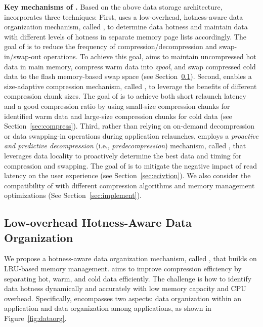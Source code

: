 \noindent\textbf{Key mechanisms of \proposal.} 
Based on the above data storage architecture, \proposal incorporates three techniques: 
First, \proposal uses a low-overhead, hotness-aware data organization mechanism, called \dataorg, to determine data hotness and maintain data with different levels of hotness in separate memory page lists accordingly. 
The goal of \dataorg is to reduce the frequency of compression/decompression and swap-in/swap-out operations. To achieve this goal, \proposal aims to maintain uncompressed hot data in main memory,  compress warm data into \emph{zpool}, and swap compressed cold data to the flash memory-based swap space (see Section~\ref{sec:dataorg}).
Second, \proposal enables a size-adaptive compression mechanism, called \compress, to leverage the benefits of different compression chunk sizes. The goal of  \compress is to achieve both short relaunch latency and a good compression ratio by using small-size compression chunks for identified warm data and large-size compression chunks for cold data (see Section~\ref{sec:compress}). 
Third, rather than relying on on-demand decompression or data swapping-in operations during application relaunches, \proposal employs a \emph{proactive and predictive decompression} (i.e., \emph{predecompression}) mechanism, called \predi, that leverages data locality to proactively determine the best data and timing for compression and swapping. The goal of \predi is to mitigate the negative impact of read latency on the user experience (see Section~\ref{sec:ecivtion}). 
We also consider the compatibility of \proposal with different compression algorithms and memory management optimizations (See Section~\ref{sec:implement}). 



 

\subsection{Low-overhead Hotness-Aware Data Organization}
\label{sec:dataorg}


We propose a hotness-aware data organization mechanism, called \dataorg, that builds on LRU-based memory management. 
\dataorg aims to improve compression efficiency by separating hot, warm, and cold data efficiently. The challenge is how to identify data hotness dynamically and accurately with low memory capacity and CPU overhead.
Specifically, \dataorg encompasses two aspects: data organization within an application and data organization among applications, as shown in Figure~\ref{fig:dataorg}.


